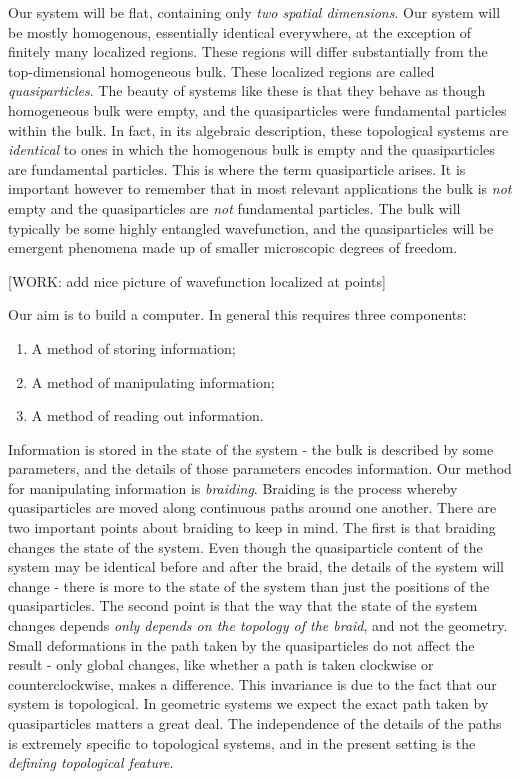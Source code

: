 \documentclass{article}
\theoremstyle{definition}
\numberwithin{figure}{section}
\begin{document}
Our system will be flat, containing only \textit{two spatial dimensions}. Our system will be mostly homogenous, essentially identical everywhere, at the exception of finitely many localized regions. These regions will differ substantially from the top-dimensional homogeneous bulk. These localized regions are called \textit{quasiparticles}. The beauty of systems like these is that they behave as though homogeneous bulk were empty, and the quasiparticles were fundamental particles within the bulk. In fact, in its algebraic description, these topological systems are \textit{identical} to ones in which the homogenous bulk is empty and the quasiparticles are fundamental particles. This is where the term quasiparticle arises. It is important however to remember that in most relevant applications the bulk is \textit{not} empty and the quasiparticles are \textit{not} fundamental particles. The bulk will typically be some highly entangled wavefunction, and the quasiparticles will be emergent phenomena made up of smaller microscopic degrees of freedom.

[WORK: add nice picture of wavefunction localized at points]

Our aim is to build a computer. In general this requires three components:

\begin{enumerate}
\item A method of storing information;
\item A method of manipulating information;
\item A method of reading out information.
\end{enumerate}

Information is stored in the state of the system - the bulk is described by some parameters, and the details of those parameters encodes information. Our method for manipulating information is \textit{braiding}. Braiding is the process whereby quasiparticles are moved along continuous paths around one another. There are two important points about braiding to keep in mind. The first is that braiding changes the state of the system. Even though the quasiparticle content of the system may be identical before and after the braid, the details of the system will change - there is more to the state of the system than just the positions of the quasiparticles. The second point is that the way that the state of the system changes depends \textit{only depends on the topology of the braid}, and not the geometry. Small deformations in the path taken by the quasiparticles do not affect the result - only global changes, like whether a path is taken clockwise or counterclockwise, makes a difference. This invariance is due to the fact that our system is topological. In geometric systems we expect the exact path taken by quasiparticles matters a great deal. The independence of the details of the paths is extremely specific to topological systems, and in the present setting is the \textit{defining topological feature}.
\end{document}
